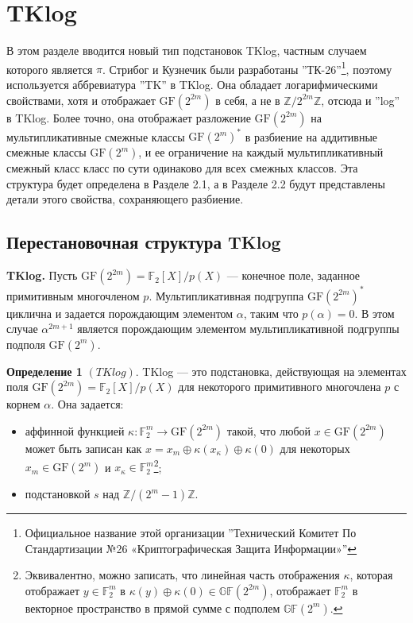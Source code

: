 \section{TKlog}

В этом разделе вводится новый тип подстановок TKlog, частным случаем которого является \(\pi\). Стрибог и Кузнечик были разработаны ''ТК-26''\footnote{Официальное название этой организации ''Технический Комитет По Стандартизации №26 «Криптографическая Защита Информации»''}, поэтому используется аббревиатура ''TK'' в TKlog. Она обладает логарифмическими свойствами, хотя и отображает \(\mathrm{GF}(2^{2m})\) в себя, а не в \(\mathbb{Z}/2^{2m}\mathbb{Z}\), отсюда и ''log'' в TKlog. Более точно, она отображает разложение \(\mathrm{GF}(2^{2m})\) на мультипликативные смежные классы \(\mathrm{GF}(2^m)^*\) в разбиение на аддитивные смежные классы \(\mathrm{GF}(2^m)\), и ее ограничение на каждый мультипликативный смежный класс класс по сути одинаково для всех смежных классов. Эта структура будет определена в Разделе 2.1, а в Разделе 2.2 будут представлены детали этого свойства, сохраняющего разбиение.

\subsection{Перестановочная структура TKlog}

\textbf{TKlog.} Пусть \(\mathrm{GF}(2^{2m}) = \mathbb{F}_2[X]/p(X)\) — конечное поле, заданное примитивным многочленом \(p\). Мультипликативная подгруппа \(\mathrm{GF}(2^{2m})^*\) циклична и задается порождающим элементом \(\alpha\), таким что \(p(\alpha) = 0\). В этом случае \(\alpha^{2m+1}\) является порождающим элементом мультипликативной подгруппы подполя \(\mathrm{GF}(2^m)\).

\textbf{Определение 1} \((TKlog)\). TKlog — это подстановка, действующая на элементах поля \(\mathrm{GF}(2^{2m}) = \mathbb{F}_2[X]/p(X)\) для некоторого примитивного многочлена \(p\) с корнем \(\alpha\). Она задается:
\begin{itemize}
    \item аффинной функцией \(\kappa : \mathbb{F}^m_2 \to \mathrm{GF}(2^{2m})\) такой, что любой \(x \in \mathrm{GF}(2^{2m})\) может быть записан как \(x = x_m \oplus \kappa(x_\kappa) \oplus \kappa(0)\) для некоторых \(x_m \in \mathrm{GF}(2^m)\) и \(x_\kappa \in \mathbb{F}^m_2\)\footnote{Эквивалентно, можно записать, что линейная часть отображения \(\kappa\), которая отображает \(y \in \mathbb{F}_2^m\) в \(\kappa(y) \oplus \kappa(0) \in \mathbb{GF}(2^{2m})\), отображает \(\mathbb{F}_2^m\) в векторное пространство в прямой сумме с подполем \(\mathbb{GF}(2^m)\).};
    \item подстановкой \(s\) над \(\mathbb{Z}/(2^m - 1)\mathbb{Z}\).
\end{itemize}

